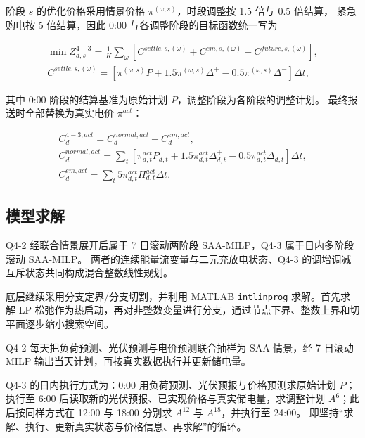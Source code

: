 阶段 \(s\) 的优化价格采用情景价格 \(\pi^{(\omega,s)}\)，时段调整按 1.5 倍与 0.5 倍结算，
紧急购电按 5 倍结算，因此 0:00 与各调整阶段的目标函数统一写为

\begin{equation}
\begin{gathered}
\min Z_{d,s}^{4-3}=\frac1K\sum_\omega\left[C^{settle,s,(\omega)}+C^{em,s,(\omega)}+C^{future,s,(\omega)}\right],\\
C^{settle,s,(\omega)}=\left[\pi^{(\omega,s)}P+1.5\pi^{(\omega,s)}\Delta^+-0.5\pi^{(\omega,s)}\Delta^-\right]\Delta t,
\end{gathered}
\end{equation}

其中 0:00 阶段的结算基准为原始计划 \(P\)，调整阶段为各阶段的调整计划。
最终报送时全部替换为真实电价 \(\pi^{act}\)：

\begin{equation}
\begin{gathered}
C_d^{4-3,act}=C_d^{normal,act}+C_d^{em,act},\\
C_d^{normal,act}=\sum_t\left[\pi^{act}_{d,t}P_{d,t}+1.5\pi^{act}_{d,t}\Delta^+_{d,t}-0.5\pi^{act}_{d,t}\Delta^-_{d,t}\right]\Delta t,\\
C_d^{em,act}=\sum_t 5\pi^{act}_{d,t}H^{act}_{d,t}\Delta t.
\end{gathered}
\end{equation}

\subsection{模型求解}

Q4-2 经联合情景展开后属于 7 日滚动两阶段 SAA-MILP，Q4-3 属于日内多阶段滚动 SAA-MILP。 两者的连续能量流变量与二元充放电状态、Q4-3 的调增调减互斥状态共同构成混合整数线性规划。

底层继续采用分支定界/分支切割，并利用 MATLAB \texttt{intlinprog} 求解。首先求解 LP 松弛作为热启动，再对非整数变量进行分支，通过节点下界、整数上界和切平面逐步缩小搜索空间。

Q4-2 每天把负荷预测、光伏预测与电价预测联合抽样为 SAA 情景，经 7 日滚动 MILP 输出当天计划，再按真实数据执行并更新储电量。

Q4-3 的日内执行方式为：0:00 用负荷预测、光伏预报与价格预测求原始计划 \(P\)；执行至 6:00 后读取新的光伏预报、已实现价格与真实储电量，求调整计划 \(A^6\)；此后按同样方式在 12:00 与 18:00 分别求 \(A^{12}\) 与 \(A^{18}\)，并执行至 24:00。
即坚持“求解、执行、更新真实状态与价格信息、再求解”的循环。


